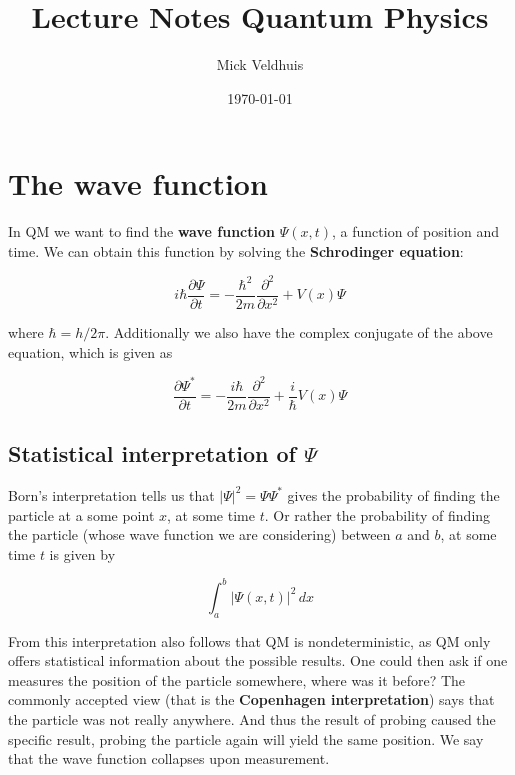 \documentclass[a4paper]{article}
\title{Lecture Notes Quantum Physics}
\author{Mick Veldhuis}
\date{\today}
\begin{document}
\maketitle

\tableofcontents

\section{The wave function}

In QM we want to find the \textbf{wave function} $\Psi(x, t)$, a function of position and time. We can obtain this function by solving the \textbf{Schrodinger equation}:

\begin{equation}
    i\hbar\frac{\partial\Psi}{\partial t}=-\frac{\hbar^2}{2m}\frac{\partial^2}{\partial x^2} + V(x)\Psi
\end{equation}

where $\hbar=h/2\pi$. Additionally we also have the complex conjugate of the above equation, which is given as

\begin{equation}
    \frac{\partial\Psi^{*}}{\partial t}=-\frac{i\hbar}{2m}\frac{\partial^2}{\partial x^2} + \frac{i}{\hbar}V(x)\Psi
\end{equation}

\subsection{Statistical interpretation of $\Psi$}

Born's interpretation tells us that $|\Psi|^2=\Psi \Psi^{*}$ gives the probability of finding the particle at a some point $x$, at some time $t$. Or rather the probability of finding the particle (whose wave function we are considering) between $a$ and $b$, at some time $t$ is given by

\begin{equation}
    \int_{a}^{b}|\Psi(x,t)|^2\,dx
\end{equation}

From this interpretation also follows that QM is nondeterministic, as QM only offers statistical information about the possible results. One could then ask if one measures the position of the particle somewhere, where was it before? The commonly accepted view (that is the \textbf{Copenhagen interpretation}) says that the particle was not really anywhere. And thus the result of probing caused the specific result, probing the particle again will yield the same position. We say that the wave function collapses upon measurement.
\end{document}
